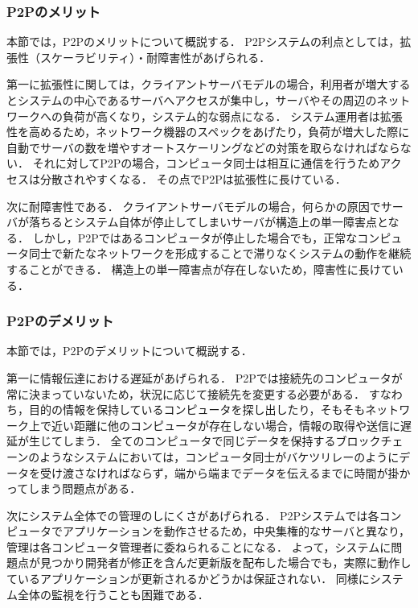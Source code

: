 \subsubsection{P2Pのメリット}

本節では，P2Pのメリットについて概説する．
P2Pシステムの利点としては，拡張性（スケーラビリティ）・耐障害性があげられる．

第一に拡張性に関しては，クライアントサーバモデルの場合，利用者が増大するとシステムの中心であるサーバへアクセスが集中し，サーバやその周辺のネットワークへの負荷が高くなり，システム的な弱点になる．
システム運用者は拡張性を高めるため，ネットワーク機器のスペックをあげたり，負荷が増大した際に自動でサーバの数を増やすオートスケーリングなどの対策を取らなければならない．
それに対してP2Pの場合，コンピュータ同士は相互に通信を行うためアクセスは分散されやすくなる．
その点でP2Pは拡張性に長けている．

次に耐障害性である．
クライアントサーバモデルの場合，何らかの原因でサーバが落ちるとシステム自体が停止してしまいサーバが構造上の単一障害点となる．
しかし，P2Pではあるコンピュータが停止した場合でも，正常なコンピュータ同士で新たなネットワークを形成することで滞りなくシステムの動作を継続することができる．
構造上の単一障害点が存在しないため，障害性に長けている．

\subsubsection{P2Pのデメリット}

本節では，P2Pのデメリットについて概説する．

第一に情報伝達における遅延があげられる．
P2Pでは接続先のコンピュータが常に決まっていないため，状況に応じて接続先を変更する必要がある．
すなわち，目的の情報を保持しているコンピュータを探し出したり，そもそもネットワーク上で近い距離に他のコンピュータが存在しない場合，情報の取得や送信に遅延が生じてしまう．
全てのコンピュータで同じデータを保持するブロックチェーンのようなシステムにおいては，コンピュータ同士がバケツリレーのようにデータを受け渡さなければならず，端から端までデータを伝えるまでに時間が掛かってしまう問題点がある．

次にシステム全体での管理のしにくさがあげられる．
P2Pシステムでは各コンピュータでアプリケーションを動作させるため，中央集権的なサーバと異なり，管理は各コンピュータ管理者に委ねられることになる．
よって，システムに問題点が見つかり開発者が修正を含んだ更新版を配布した場合でも，実際に動作しているアプリケーションが更新されるかどうかは保証されない．
同様にシステム全体の監視を行うことも困難である．

